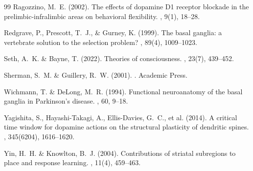 \documentclass[11pt,a4paper]{article}
\begin{document}
\begin{thebibliography}{99}
Ragozzino, M.~E. (2002).
\newblock The effects of dopamine D1 receptor blockade in the prelimbic-infralimbic areas on behavioral flexibility.
, 9(1), 18--28.

Redgrave, P., Prescott, T.~J., \& Gurney, K. (1999).
\newblock The basal ganglia: a vertebrate solution to the selection problem?
, 89(4), 1009--1023.

Seth, A.~K. \& Bayne, T. (2022).
\newblock Theories of consciousness.
, 23(7), 439--452.

Sherman, S.~M. \& Guillery, R.~W. (2001).
.
\newblock Academic Press.

Wichmann, T. \& DeLong, M.~R. (1994).
\newblock Functional neuroanatomy of the basal ganglia in Parkinson's disease.
, 60, 9--18.

Yagishita, S., Hayashi-Takagi, A., Ellis-Davies, G.~C., et al. (2014).
\newblock A critical time window for dopamine actions on the structural plasticity of dendritic spines.
, 345(6204), 1616--1620.

Yin, H.~H. \& Knowlton, B.~J. (2004).
\newblock Contributions of striatal subregions to place and response learning.
, 11(4), 459--463.

\end{thebibliography}
\end{document}
